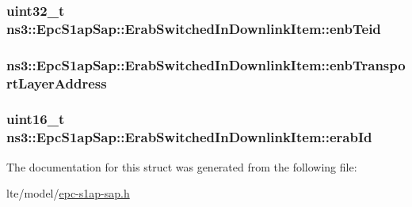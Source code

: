 \subsubsection[{\texorpdfstring{enb\+Teid}{enbTeid}}]{\setlength{\rightskip}{0pt plus 5cm}uint32\+\_\+t ns3\+::\+Epc\+S1ap\+Sap\+::\+Erab\+Switched\+In\+Downlink\+Item\+::enb\+Teid}\hypertarget{structns3_1_1EpcS1apSap_1_1ErabSwitchedInDownlinkItem_a3e3f7e49c08335d7d61434c0f62832dc}{}\label{structns3_1_1EpcS1apSap_1_1ErabSwitchedInDownlinkItem_a3e3f7e49c08335d7d61434c0f62832dc}
\subsubsection[{\texorpdfstring{enb\+Transport\+Layer\+Address}{enbTransportLayerAddress}}]{ ns3\+::\+Epc\+S1ap\+Sap\+::\+Erab\+Switched\+In\+Downlink\+Item\+::enb\+Transport\+Layer\+Address}\hypertarget{structns3_1_1EpcS1apSap_1_1ErabSwitchedInDownlinkItem_a34d411f0905fbc3c9eb0eb52ba93c086}{}\label{structns3_1_1EpcS1apSap_1_1ErabSwitchedInDownlinkItem_a34d411f0905fbc3c9eb0eb52ba93c086}
\subsubsection[{\texorpdfstring{erab\+Id}{erabId}}]{\setlength{\rightskip}{0pt plus 5cm}uint16\+\_\+t ns3\+::\+Epc\+S1ap\+Sap\+::\+Erab\+Switched\+In\+Downlink\+Item\+::erab\+Id}\hypertarget{structns3_1_1EpcS1apSap_1_1ErabSwitchedInDownlinkItem_aa3b67cf8a0630fe9e66ddc8c8a87baa5}{}\label{structns3_1_1EpcS1apSap_1_1ErabSwitchedInDownlinkItem_aa3b67cf8a0630fe9e66ddc8c8a87baa5}


The documentation for this struct was generated from the following file\+:\begin{DoxyCompactItemize}
\item 
lte/model/\hyperlink{epc-s1ap-sap_8h}{epc-\/s1ap-\/sap.\+h}\end{DoxyCompactItemize}
